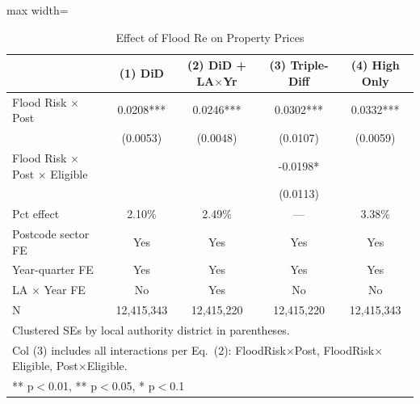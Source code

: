 \begin{table}[htbp]
\centering
\caption{Effect of Flood Re on Property Prices}
\label{tab:main}
\begin{adjustbox}{max width=\textwidth}
\begin{tabular}{lcccc}
\hline\hline
 & (1) DiD & (2) DiD + LA$\times$Yr & (3) Triple-Diff & (4) High Only \\
\hline
Flood Risk $\times$ Post & 0.0208*** & 0.0246*** & 0.0302*** & 0.0332*** \\
 & (0.0053) & (0.0048) & (0.0107) & (0.0059) \\

Flood Risk $\times$ Post $\times$ Eligible & & & -0.0198* & \\
 & & & (0.0113) & \\

Pct effect & 2.10\% & 2.49\% & --- & 3.38\% \\
\hline
Postcode sector FE & Yes & Yes & Yes & Yes \\
Year-quarter FE & Yes & Yes & Yes & Yes \\
LA $\times$ Year FE & No & Yes & No & No \\
\hline
N & 12,415,343 & 12,415,220 & 12,415,220 & 12,415,343 \\
\hline\hline
\multicolumn{5}{l}{\footnotesize Clustered SEs by local authority district in parentheses.} \\
\multicolumn{5}{l}{\footnotesize Col (3) includes all interactions per Eq.\ (2): FloodRisk$\times$Post, FloodRisk$\times$Eligible, Post$\times$Eligible.} \\
\multicolumn{5}{l}{\footnotesize *** p$<$0.01, ** p$<$0.05, * p$<$0.1} \\
\end{tabular}
\end{adjustbox}
\end{table}
